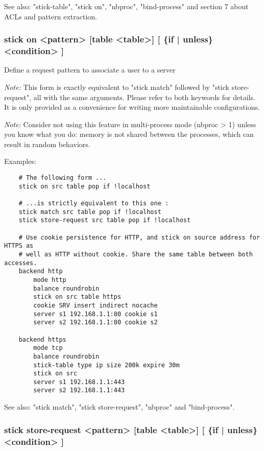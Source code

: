   See also: "stick-table", "stick on", "nbproc", "bind-process" and section 7
             about ACLs and pattern extraction.


\subsubsection[stick on]{stick on <pattern> [table <table>] [ \{if | unless\} <condition> ]}


  Define a request pattern to associate a user to a server


  \emph{Note:} This form is exactly equivalent to "stick match" followed by
         "stick store-request", all with the same arguments. Please refer
         to both keywords for details. It is only provided as a convenience
         for writing more maintainable configurations.

  \emph{Note:} Consider not using this feature in multi-process mode (nbproc > 1)
         unless you know what you do: memory is not shared between the
         processes, which can result in random behaviors.

  Examples:
  \begin{verbatim}
    # The following form ...
    stick on src table pop if !localhost

    # ...is strictly equivalent to this one :
    stick match src table pop if !localhost
    stick store-request src table pop if !localhost

    # Use cookie persistence for HTTP, and stick on source address for HTTPS as
    # well as HTTP without cookie. Share the same table between both accesses.
    backend http
        mode http
        balance roundrobin
        stick on src table https
        cookie SRV insert indirect nocache
        server s1 192.168.1.1:80 cookie s1
        server s2 192.168.1.1:80 cookie s2

    backend https
        mode tcp
        balance roundrobin
        stick-table type ip size 200k expire 30m
        stick on src
        server s1 192.168.1.1:443
        server s2 192.168.1.1:443
   \end{verbatim}

  See also: "stick match", "stick store-request", "nbproc" and "bind-process".


\subsubsection[stick store-request]{stick store-request <pattern> [table <table>] [ \{if | unless\} <condition> ]}

